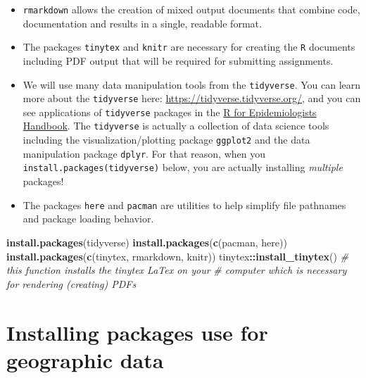 \documentclass[
]{book}
\newenvironment{Shaded}{\begin{snugshade}}{\end{snugshade}}
\newcommand{\CommentTok}[1]{\textcolor[rgb]{0.56,0.35,0.01}{\textit{#1}}}
\newcommand{\FunctionTok}[1]{\textcolor[rgb]{0.13,0.29,0.53}{\textbf{#1}}}
\newcommand{\NormalTok}[1]{#1}
\newcommand{\SpecialCharTok}[1]{\textcolor[rgb]{0.81,0.36,0.00}{\textbf{#1}}}
\newcommand{\StringTok}[1]{\textcolor[rgb]{0.31,0.60,0.02}{#1}}
\providecommand{\tightlist}{%
  \setlength{\itemsep}{0pt}\setlength{\parskip}{0pt}}
\begin{document}
\begin{itemize}
\tightlist
\item
  \texttt{rmarkdown} allows the creation of mixed output documents that combine code, documentation and results in a single, readable format.
\item
  The packages \texttt{tinytex} and \texttt{knitr} are necessary for creating the \texttt{R} documents including PDF output that will be required for submitting assignments.
\item
  We will use many data manipulation tools from the \texttt{tidyverse}. You can learn more about the \texttt{tidyverse} here: \url{https://tidyverse.tidyverse.org/}, and you can see applications of \texttt{tidyverse} packages in the \href{https://epirhandbook.com/index.html}{R for Epidemiologists Handbook}. The \texttt{tidyverse} is actually a collection of data science tools including the visualization/plotting package \texttt{ggplot2} and the data manipulation package \texttt{dplyr}. For that reason, when you \texttt{install.packages(\textquotesingle{}tidyverse\textquotesingle{})} below, you are actually installing \emph{multiple} packages!
\item
  The packages \texttt{here} and \texttt{pacman} are utilities to help simplify file pathnames and package loading behavior.
\end{itemize}

\begin{Shaded}
\begin{Highlighting}[]
\FunctionTok{install.packages}\NormalTok{(}\StringTok{\textquotesingle{}tidyverse\textquotesingle{}}\NormalTok{)   }
\FunctionTok{install.packages}\NormalTok{(}\FunctionTok{c}\NormalTok{(}\StringTok{\textquotesingle{}pacman\textquotesingle{}}\NormalTok{, }\StringTok{\textquotesingle{}here\textquotesingle{}}\NormalTok{))}
\FunctionTok{install.packages}\NormalTok{(}\FunctionTok{c}\NormalTok{(}\StringTok{\textquotesingle{}tinytex\textquotesingle{}}\NormalTok{, }\StringTok{\textquotesingle{}rmarkdown\textquotesingle{}}\NormalTok{, }\StringTok{\textquotesingle{}knitr\textquotesingle{}}\NormalTok{)) }
\NormalTok{tinytex}\SpecialCharTok{::}\FunctionTok{install\_tinytex}\NormalTok{()  }
\CommentTok{\# this function installs the tinytex LaTex on your}
\CommentTok{\#  computer which is necessary for rendering (creating) PDF\textquotesingle{}s }
\end{Highlighting}
\end{Shaded}

\hypertarget{installing-packages-use-for-geographic-data}{%
\section*{Installing packages use for geographic data}\label{installing-packages-use-for-geographic-data}}
\end{document}
